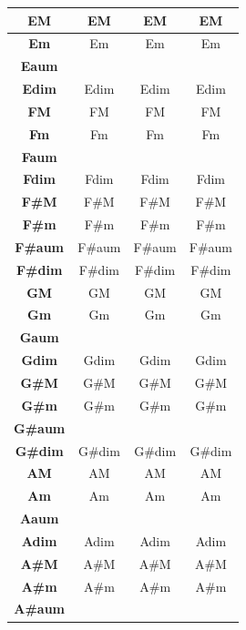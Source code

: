 \begin{table}[ht!]
{\begin{tabular}{ | c | c | c | c |}
  \hline
  \textbf{EM} & EM & EM & EM \\ 
  \hline
  \textbf{Em} & Em & Em & Em \\ 
  \hline
  \textbf{Eaum} & \color{red}{Caum} & \color{red}{Caum} & \color{red}{Caum} \\ 
  \hline
  \textbf{Edim} & Edim & Edim & Edim \\ 
  \hline
  \textbf{FM} & FM & FM & FM \\ 
  \hline
  \textbf{Fm} & Fm & Fm & Fm \\ 
  \hline
  \textbf{Faum} & \color{red}{C\#aum} & \color{red}{C\#aum} & \color{red}{C\#aum} \\ 
  \hline
  \textbf{Fdim} & Fdim & Fdim & Fdim \\ 
  \hline
  \textbf{F\#M} & F\#M & F\#M & F\#M \\ 
  \hline
  \textbf{F\#m} & F\#m & F\#m & F\#m \\ 
  \hline
  \textbf{F\#aum} & F\#aum & F\#aum & F\#aum \\ 
  \hline
  \textbf{F\#dim} & F\#dim & F\#dim & F\#dim \\ 
  \hline
  \textbf{GM} & GM & GM & GM \\ 
  \hline
  \textbf{Gm} & Gm & Gm & Gm \\ 
  \hline
  \textbf{Gaum} & \color{red}{D\#aum} & \color{red}{D\#aum} & \color{red}{D\#aum} \\ 
  \hline
  \textbf{Gdim} & Gdim & Gdim & Gdim \\ 
  \hline
  \textbf{G\#M} & G\#M & G\#M & G\#M \\ 
  \hline
  \textbf{G\#m} & G\#m & G\#m & G\#m \\ 
  \hline
  \textbf{G\#aum} & \color{red}{Caum} & \color{red}{Caum} & \color{red}{Caum} \\ 
  \hline
  \textbf{G\#dim} & G\#dim & G\#dim & G\#dim \\ 
  \hline
  \textbf{AM} & AM & AM & AM \\ 
  \hline
  \textbf{Am} & Am & Am & Am \\ 
  \hline
  \textbf{Aaum} & \color{red}{C\#aum} & \color{red}{C\#aum} & \color{red}{C\#aum} \\ 
  \hline
  \textbf{Adim} & Adim & Adim & Adim \\ 
  \hline
  \textbf{A\#M} & A\#M & A\#M & A\#M \\ 
  \hline
  \textbf{A\#m} & A\#m & A\#m & A\#m \\ 
  \hline
  \textbf{A\#aum} & \color{red}{F\#aum} & \color{red}{F\#aum} & \color{red}{F\#aum} \\ 

\end{tabular}}
\end{table}
